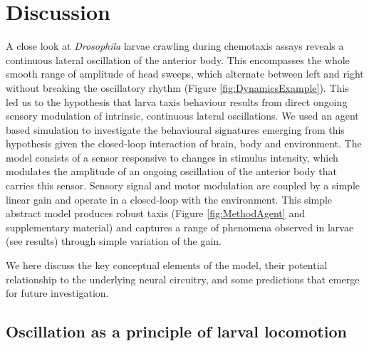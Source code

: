 \documentclass[11pt,a4paper]{article}
\newcommand{\Dros }{\emph{Drosophila }}
\newcommand{\todoBW}[1]{\todo[author=BW,color=orange, size=\tiny,inline]{1}}
\begin{document}
\section{Discussion}
A close look at \Dros larvae crawling during chemotaxis assays reveals a continuous lateral oscillation of the anterior body. This encompasses the whole smooth range of amplitude of head sweeps, which alternate between left and right without breaking the oscillatory rhythm (Figure \ref{fig:DynamicsExample}). This led us to the hypothesis that larva taxis behaviour results from direct ongoing sensory modulation of intrinsic, continuous lateral oscillations. We used an agent based simulation to investigate the behavioural signatures emerging from this hypothesis given the closed-loop interaction of brain, body and environment. 
 The model consists of a sensor responsive to changes in stimulus intensity, which modulates the amplitude of an ongoing oscillation of the anterior body that carries this sensor. Sensory signal and motor modulation are coupled by a simple linear gain and operate in a closed-loop with the environment. This simple abstract model produces robust taxis (Figure \ref{fig:MethodAgent} and supplementary material) and captures a range of phenomena observed in larvae (see results) through simple variation of the gain.

 We here discuss the key conceptual elements of the model, their potential relationship to the underlying neural circuitry, and some predictions that emerge for future investigation.


\subsection{Oscillation as a principle of larval locomotion}
\end{document}
